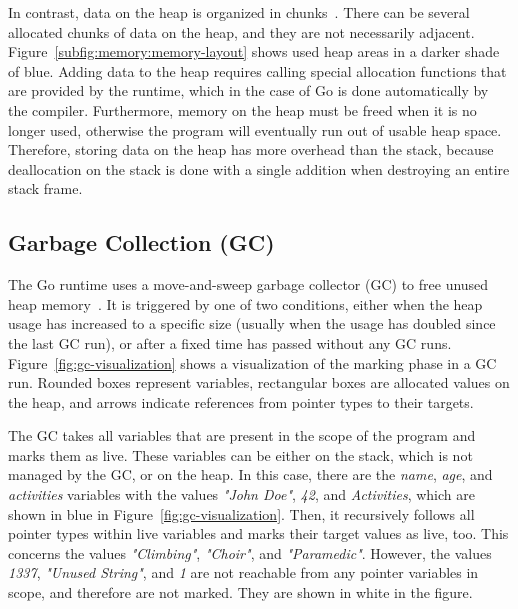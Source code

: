 In contrast, data on the heap is organized in chunks~\cite{ferres2010}.
There can be several allocated chunks of data on the heap, and they are not necessarily adjacent.
Figure~\ref{subfig:memory:memory-layout} shows used heap areas in a darker shade of blue.
Adding data to the heap requires calling special allocation functions that are provided by the runtime, which in the
case of Go is done automatically by the compiler.
Furthermore, memory on the heap must be freed when it is no longer used, otherwise the program will eventually run out
of usable heap space.
Therefore, storing data on the heap has more overhead than the stack, because deallocation on the stack is done with a
single addition when destroying an entire stack frame.



\subsection{Garbage Collection (GC)}\label{subsec:background:memory:gc}

The Go runtime uses a move-and-sweep garbage collector (\acrshort{GC}) to free unused heap memory~\cite{sibiryov2017}.
It is triggered by one of two conditions, either when the heap usage has increased to a specific size (usually when the
usage has doubled since the last \acrshort{GC} run), or after a fixed time has passed without any \acrshort{GC} runs.
Figure~\ref{fig:gc-visualization} shows a visualization of the marking phase in a \acrshort{GC} run.
Rounded boxes represent variables, rectangular boxes are allocated values on the heap, and arrows indicate references
from pointer types to their targets.



The \acrshort{GC} takes all variables that are present in the scope of the program and marks them as live.
These variables can be either on the stack, which is not managed by the \acrshort{GC}, or on the heap.
In this case, there are the \textit{name}, \textit{age}, and \textit{activities} variables with the values
\textit{"John Doe"}, \textit{42}, and \textit{Activities}, which are shown in blue in Figure~\ref{fig:gc-visualization}.
Then, it recursively follows all pointer types within live variables and marks their target values as live, too.
This concerns the values \textit{"Climbing"}, \textit{"Choir"}, and \textit{"Paramedic"}.
However, the values \textit{1337}, \textit{"Unused String"}, and \textit{1} are not reachable from any pointer variables
in scope, and therefore are not marked.
They are shown in white in the figure.

